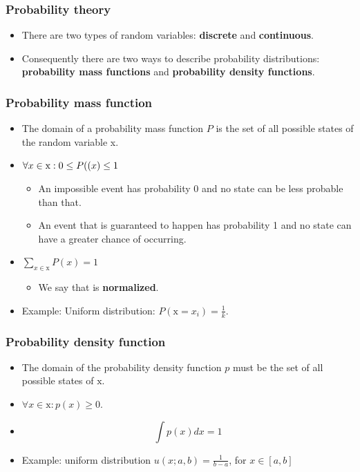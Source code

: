 \documentclass[notes]{beamer}          %
\begin{document}
\begin{frame}
\frametitle{Probability theory}
    \begin{itemize}
        \item There are two types of random variables: {\bf discrete} and {\bf continuous}.
        \item Consequently there are two ways to describe probability distributions: {\bf probability mass functions} and {\bf probability density functions}.
    \end{itemize}
\end{frame}


\begin{frame}
\frametitle{Probability mass function}
\begin{itemize}
    \item The domain of a probability mass function $P$ is the set of all possible states of the random variable x.
    \item $\forall x \in \text{x}: 0 \leq P(\text(x) \leq 1$
        \begin{itemize}
            \item An impossible event has probability 0 and no state can be less probable than that.
            \item An event that is guaranteed to happen has probability 1 and no state can have a greater chance of occurring.
        \end{itemize}
    \item $\sum_{x \in \text{x}} P(x) = 1$
        \begin{itemize}
            \item We say that  is {\bf normalized}.
        \end{itemize}
    \item Example: Uniform distribution: $P(\text{x} = x_i) = \frac{1}{k}$.
\end{itemize}
\end{frame}


\begin{frame}
\frametitle{Probability density function}
\begin{itemize}
    \item The domain of the probability density function $p$ must be the set of all possible states of $\text{x}$.
    \item $\forall x \in \text{x}: p(x)\geq 0.$
    \item $$\int p(x)dx = 1$$
    \item Example: uniform distribution $u(x;a,b) = \frac{1}{b-a}$, for $x \in [a,b]$
\end{itemize}

\end{frame}
\end{document}
